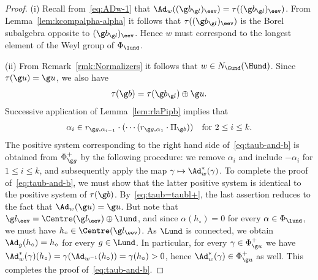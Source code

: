 \documentclass[12pt]{amsart}
\begin{document}
\begin{proof}
(i)
Recall from~\eqref{eq:ADw-1} that $\Ad_w((\g b_{\g l})_\eev)=\tau((\g b_{\g l})_\eev)$.  From Lemma~\ref{lem:kcompalpha-alpha} it follows that $\tau((\g b_{\g l})_\eev)$ is the Borel subalgebra opposite to $(\g b_{\g l})_\eev$. Hence $w$ must correspond to the longest element of the Weyl group of $\Phi_{\lund}$. 

(ii) 
From Remark~\ref{rmk:Normalizers} it follows that $w\in N_{\Gund}(\Hund)$. 
Since $\tau(\g u)=\g u$, we also have \begin{equation}
\label{eq:taub=taubl+}
\tau(\g b)=\tau(\g b_{\g l})\oplus \g u.
\end{equation} 
Successive application of Lemma~\ref{lem:rlaPipb} implies that \[
\alpha_i\in r_{\g g,\alpha_{i-1}}\cdot(\cdots(r_{\g g,\alpha_1}\cdot \Pi_{\g b}))
\quad\text{for }2\leq i\leq k.
\]
The positive system corresponding to the right hand side 
of~\eqref{eq:taub-and-b} is obtained from $\Phi_{\g g}^+$ by the following procedure: we remove $\alpha_i$ and include $-\alpha_i$ for $1\leq i\leq k$, and subsequently apply the map $\gamma\mapsto \Ad_w^*(\gamma)$. To complete the proof of~\eqref{eq:taub-and-b}, we must show that the latter positive system is identical to the positive system of $\tau(\g b)$. By~\eqref{eq:taub=taubl+}, the last assertion reduces to the fact that $\Ad_w(\g u)=\g u$. But 
note that $\g l_\eev=\Centre(\g l_\eev)\oplus \lund$, and since $\alpha(h_\circ)=0$ for every $\alpha\in\Phi_{\lund}$, we must have $h_\circ\in \Centre(\g l_\eev)$. As $\Lund$ is connected, we obtain $\Ad_g(h_\circ)=h_\circ$ for every $g\in \Lund$. In particular, for every $\gamma\in\Phi_{\g u}^+$ we have $\Ad_w^*(\gamma)(h_\circ)=\gamma(\Ad_{w^{-1}}(h_\circ))=\gamma(h_\circ) >0$, hence $\Ad_w^*(\gamma)\in \Phi_{\g u}^+$ as well. 
This completes the proof of~\eqref{eq:taub-and-b}. 
\end{proof} 
\end{document}
